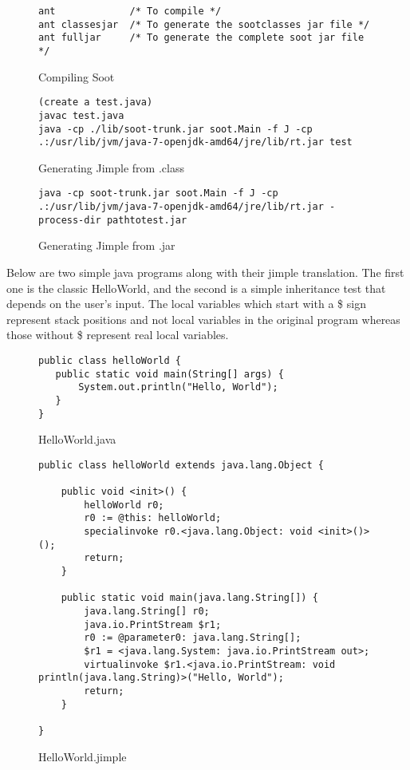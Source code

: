 \documentclass{dithesis}
\begin{document}
        \begin{figure}[H]
\begin{lstlisting}
ant             /* To compile */
ant classesjar  /* To generate the sootclasses jar file */
ant fulljar     /* To generate the complete soot jar file */
\end{lstlisting}
        \caption{Compiling Soot}
        \end{figure}
        \begin{figure}[H]
\begin{lstlisting}
(create a test.java)
javac test.java
java -cp ./lib/soot-trunk.jar soot.Main -f J -cp .:/usr/lib/jvm/java-7-openjdk-amd64/jre/lib/rt.jar test
\end{lstlisting}
        \caption{Generating Jimple from .class}
        \end{figure}
        \begin{figure}[H]
\begin{lstlisting}
java -cp soot-trunk.jar soot.Main -f J -cp .:/usr/lib/jvm/java-7-openjdk-amd64/jre/lib/rt.jar -process-dir pathtotest.jar
\end{lstlisting}
        \caption{Generating Jimple from .jar}
        \end{figure}

        Below are two simple java programs along with their jimple translation. The first one is the classic HelloWorld, and the second is a simple inheritance test that depends on the user's input. 
       	The local variables which start with a \$ sign represent stack positions and not local variables in the original program whereas those without \$ represent real local variables.
            \begin{figure}[H]
\begin{lstlisting}
public class helloWorld {
   public static void main(String[] args) {
       System.out.println("Hello, World");
   }
}
\end{lstlisting}
            \caption{HelloWorld.java}
            \end{figure}
            \begin{figure}[H]
\begin{lstlisting}
public class helloWorld extends java.lang.Object {

    public void <init>() {
        helloWorld r0;
        r0 := @this: helloWorld;
        specialinvoke r0.<java.lang.Object: void <init>()>();
        return;
    }

    public static void main(java.lang.String[]) {
        java.lang.String[] r0;
        java.io.PrintStream $r1;
        r0 := @parameter0: java.lang.String[];
        $r1 = <java.lang.System: java.io.PrintStream out>;
        virtualinvoke $r1.<java.io.PrintStream: void println(java.lang.String)>("Hello, World");
        return;
    }

}
\end{lstlisting}
            \caption{HelloWorld.jimple}
            \end{figure}
\end{document}
